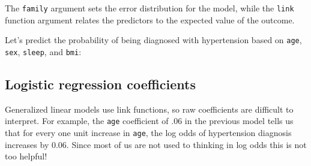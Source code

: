 \documentclass[
]{book}
\newenvironment{Shaded}{\begin{snugshade}}{\end{snugshade}}
\newcommand{\CommentTok}[1]{\textcolor[rgb]{0.56,0.35,0.01}{\textit{#1}}}
\newcommand{\DataTypeTok}[1]{\textcolor[rgb]{0.13,0.29,0.53}{#1}}
\newcommand{\DecValTok}[1]{\textcolor[rgb]{0.00,0.00,0.81}{#1}}
\newcommand{\KeywordTok}[1]{\textcolor[rgb]{0.13,0.29,0.53}{\textbf{#1}}}
\newcommand{\NormalTok}[1]{#1}
\newcommand{\OperatorTok}[1]{\textcolor[rgb]{0.81,0.36,0.00}{\textbf{#1}}}
\newcommand{\StringTok}[1]{\textcolor[rgb]{0.31,0.60,0.02}{#1}}
\begin{document}
The \texttt{family} argument sets the error distribution for the model, while the \texttt{link} function
argument relates the predictors to the expected value of the outcome.

Let's predict the probability of being diagnosed with hypertension based on \texttt{age}, \texttt{sex}, \texttt{sleep}, and \texttt{bmi}:

\begin{Shaded}
\end{Shaded}

\hypertarget{logistic-regression-coefficients}{%
\subsection{Logistic regression coefficients}\label{logistic-regression-coefficients}}

Generalized linear models use link functions, so raw coefficients are difficult to interpret. For example, the \texttt{age} coefficient of .06 in the previous model tells us that for every one unit increase in \texttt{age}, the log odds of hypertension diagnosis increases by 0.06. Since most of us are not used to thinking in log odds this is not too helpful!
\end{document}
